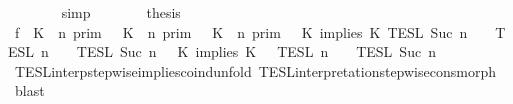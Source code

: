 \begin{isabellebody}
\ \ \ \ \ \ \isamarkupfalse%
\ simp\isanewline
\ \ \ \ \isamarkupfalse%
\ \isamarkupfalse%
\ {\isacharquery}thesis\isanewline
\ \ \ \ \isamarkupfalse%
\ {\isacharminus}\isanewline
\ \ \ \ \ \ \isamarkupfalse%
\ f{}{\isacharcolon}\ {\isacartoucheopen}{\isacharparenleft}{\isasymlbrakk}\ K\ {\isasymnot}{\isasymUp}\ n\ {\isasymrbrakk}\isactrlsub p\isactrlsub r\isactrlsub i\isactrlsub m\ {\isasymunion}\ {\isasymlbrakk}\ K\ {\isasymUp}\ n\ {\isasymrbrakk}\isactrlsub p\isactrlsub r\isactrlsub i\isactrlsub m\ {\isasyminter}\ {\isasymlbrakk}\ K\ {\isasymUp}\ n\ {\isasymrbrakk}\isactrlsub p\isactrlsub r\isactrlsub i\isactrlsub m{\isacharparenright}\ {\isasyminter}\ {\isasymlbrakk}\ K\ implies\ K\ {\isasymrbrakk}\isactrlsub T\isactrlsub E\isactrlsub S\isactrlsub L\isactrlbsup {\isasymge}\ Suc\ n\isactrlesup \ {\isasyminter}\ {\isacharparenleft}{\isasymlbrakk}{\isasymlbrakk}\ {\isasymPsi}\ {\isasymrbrakk}{\isasymrbrakk}\isactrlsub T\isactrlsub E\isactrlsub S\isactrlsub L\isactrlbsup {\isasymge}\ n\isactrlesup \ {\isasyminter}\ {\isasymlbrakk}{\isasymlbrakk}\ {\isasymPhi}\ {\isasymrbrakk}{\isasymrbrakk}\isactrlsub T\isactrlsub E\isactrlsub S\isactrlsub L\isactrlbsup {\isasymge}\ Suc\ n\isactrlesup {\isacharparenright}\ {\isacharequal}\ {\isasymlbrakk}{\isasymlbrakk}\ {\isacharparenleft}K\ implies\ K\ {\isacharhash}\ {\isasymPsi}\ {\isasymrbrakk}{\isasymrbrakk}\isactrlsub T\isactrlsub E\isactrlsub S\isactrlsub L\isactrlbsup {\isasymge}\ n\isactrlesup \ {\isasyminter}\ {\isasymlbrakk}{\isasymlbrakk}\ {\isasymPhi}\ {\isasymrbrakk}{\isasymrbrakk}\isactrlsub T\isactrlsub E\isactrlsub S\isactrlsub L\isactrlbsup {\isasymge}\ Suc\ n\isactrlesup {\isacartoucheclose}\isanewline
\ \ \ \ \ \ \ \ \isamarkupfalse%
\ TESL{\isacharunderscore}interp{\isacharunderscore}stepwise{\isacharunderscore}implies{\isacharunderscore}coind{\isacharunderscore}unfold\ TESL{\isacharunderscore}interpretation{\isacharunderscore}stepwise{\isacharunderscore}cons{\isacharunderscore}morph\ \isamarkupfalse%
\ blast\isanewline
\ \ \ \ \ \ \isamarkupfalse%

\end{isabellebody}
